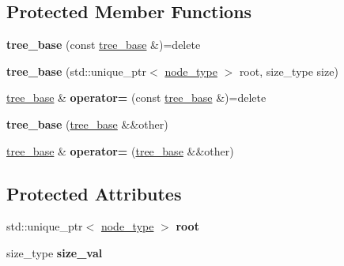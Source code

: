 \subsection*{Protected Member Functions}
\begin{DoxyCompactItemize}
\item 
{\bfseries tree\+\_\+base} (const \hyperlink{classds_1_1tree__base}{tree\+\_\+base} \&)=delete\hypertarget{classds_1_1tree__base_a32306a7291bfd221b32dbb2415105ffd}{}\label{classds_1_1tree__base_a32306a7291bfd221b32dbb2415105ffd}

\item 
{\bfseries tree\+\_\+base} (std\+::unique\+\_\+ptr$<$ \hyperlink{classds_1_1node}{node\+\_\+type} $>$ root, size\+\_\+type size)\hypertarget{classds_1_1tree__base_ab4c0fe27f9cebbd5c52b20cd99dc8ef0}{}\label{classds_1_1tree__base_ab4c0fe27f9cebbd5c52b20cd99dc8ef0}

\item 
\hyperlink{classds_1_1tree__base}{tree\+\_\+base} \& {\bfseries operator=} (const \hyperlink{classds_1_1tree__base}{tree\+\_\+base} \&)=delete\hypertarget{classds_1_1tree__base_a9216427e3ef4a7059479f5cf7b5db0c1}{}\label{classds_1_1tree__base_a9216427e3ef4a7059479f5cf7b5db0c1}

\item 
{\bfseries tree\+\_\+base} (\hyperlink{classds_1_1tree__base}{tree\+\_\+base} \&\&other)\hypertarget{classds_1_1tree__base_a8f324183929101fcf2e9878bb7210dff}{}\label{classds_1_1tree__base_a8f324183929101fcf2e9878bb7210dff}

\item 
\hyperlink{classds_1_1tree__base}{tree\+\_\+base} \& {\bfseries operator=} (\hyperlink{classds_1_1tree__base}{tree\+\_\+base} \&\&other)\hypertarget{classds_1_1tree__base_ab588abb8213d1cf267b644a76645290f}{}\label{classds_1_1tree__base_ab588abb8213d1cf267b644a76645290f}

\end{DoxyCompactItemize}
\subsection*{Protected Attributes}
\begin{DoxyCompactItemize}
\item 
std\+::unique\+\_\+ptr$<$ \hyperlink{classds_1_1node}{node\+\_\+type} $>$ {\bfseries root}\hypertarget{classds_1_1tree__base_ae5a4c3937a4aceb07f7e5dec92ee3b67}{}\label{classds_1_1tree__base_ae5a4c3937a4aceb07f7e5dec92ee3b67}

\item 
size\+\_\+type {\bfseries size\+\_\+val}\hypertarget{classds_1_1tree__base_a3541fffa8689f52f5e34e7e6cf26c9b7}{}\label{classds_1_1tree__base_a3541fffa8689f52f5e34e7e6cf26c9b7}

\end{DoxyCompactItemize}
